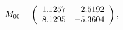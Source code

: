 \begin{equation}
M_{00}=
\left(
\begin{array}{c c}
1.1257&
-2.5192\\
8.1295&
-5.3604\\
\end{array}
\right),
\end{equation}

